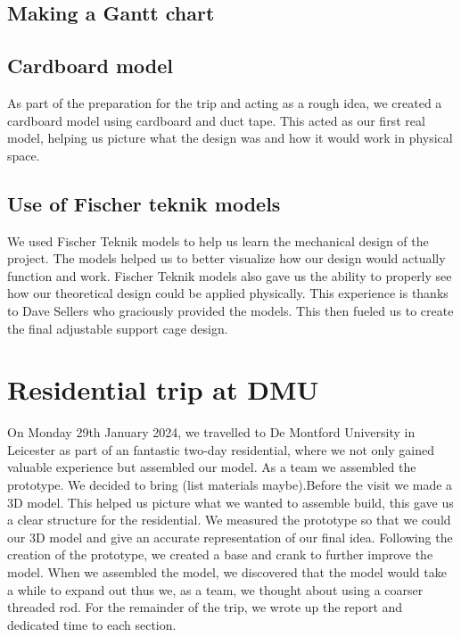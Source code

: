 \documentclass[a4paper,10pt]{article}
\begin{document}
\subsection{Making a Gantt chart}
\subsection{Cardboard model}
As part of the preparation for the trip and acting as a rough idea, we created a cardboard model using cardboard and duct tape. This acted as our first real model, helping us picture what the design was and how it would work in physical space.

\subsection{Use of Fischer teknik models}
We used Fischer Teknik models to help us learn the mechanical design of the project. The models helped us to better visualize how our design would actually function and work. Fischer Teknik models also gave us the ability to properly see how our theoretical design could be applied physically. This experience is thanks to Dave Sellers who graciously provided the models. This then fueled us to create the final adjustable support cage design.

\section{Residential trip at \gls{DMU}}
On Monday 29th January 2024, we travelled to De Montford University in Leicester as part of an fantastic two-day residential, where we not only gained valuable experience but assembled our model. As a team we assembled the prototype. We decided to bring (list materials maybe).Before the visit we made a 3D model. This helped us picture what we wanted to assemble build, this gave us a clear structure for the residential.  We measured the prototype so that we could our 3D model and give an accurate representation of our final idea. Following the creation of the prototype, we created a base and crank to further improve the model. When we assembled the model, we discovered that the model would take a while to expand out thus we, as a team, we thought about using a coarser threaded rod. For the remainder of the trip, we wrote up the report and dedicated time to each section.



\pagebreak
\printglossaries
\end{document}
